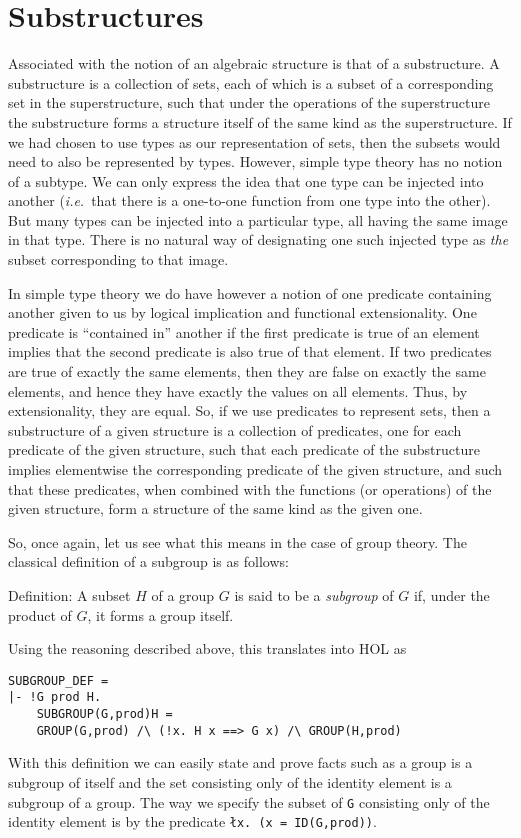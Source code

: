 \section{Substructures}

Associated with the notion of an algebraic structure is that of a
substructure.  A substructure is a collection of sets, each of which
is a subset of a corresponding set in the superstructure, such that
under the operations of the superstructure the substructure forms a
structure itself of the same kind as the superstructure.  If we had
chosen to use types as our representation of sets, then the subsets
would need to also be represented by types.  However, simple type
theory has no notion of a subtype.  We can only express the idea that
one type can be injected into another ({\it i.e.}~that there is a
one-to-one function from one type into the other).  But many types can
be injected into a particular type, all having the same image in that
type.  There is no natural way of designating one such injected type as
{\it the\/} subset corresponding to that image.

In simple type theory we do have however a notion of one predicate
containing another given to us by logical implication and functional
extensionality.  One predicate is ``contained in'' another if the
first predicate is true of an element implies that the second
predicate is also true of that element.  If two predicates are true of
exactly the same elements, then they are false on exactly the same
elements, and hence they have exactly the values on all elements.
Thus, by extensionality, they are equal.  So, if we use predicates to
represent sets, then a substructure of a given structure is a
collection of predicates, one for each predicate of the given
structure, such that each predicate of the substructure implies
elementwise the corresponding predicate of the given structure, and
such that these predicates, when combined with the functions (or
operations) of the given structure, form a structure of the same kind
as the given one.

So, once again, let us see what this means in the case of group
theory.  The classical definition of a subgroup is as follows:
\begin{display}{Definition:}
A subset $H$ of a group $G$ is said to be a {\it subgroup\/} of $G$ if,
under the product of $G$, it forms a group itself.
\end{display}
Using the reasoning described above, this translates into HOL as
\begin{verbatim}
SUBGROUP_DEF =
|- !G prod H.
    SUBGROUP(G,prod)H =
    GROUP(G,prod) /\ (!x. H x ==> G x) /\ GROUP(H,prod)
\end{verbatim}
With this definition we can easily state and prove facts such as a
group is a subgroup of itself and the set consisting only of the
identity element is a subgroup of a group.  The way we specify the
subset of {\tt G} consisting only of the identity element is by the
predicate \mbox{\tt {\l}x.~(x = ID(G,prod))}.

